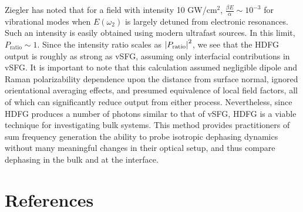 \documentclass[aip, jcp, reprint, onecolumn]{revtex4-2}
\begin{document}
 Ziegler has noted that for a field with intensity 10 GW/cm$^{2}$, $\frac{\beta E}{\alpha} \sim 10^{-3} $ for vibrational modes when $E(\omega_2)$ is largely detuned from electronic resonances. \cite{RN515}
 Such an intensity is easily obtained using modern ultrafast sources.
 In this limit, $P_\text{ratio} \sim 1$.
 Since the intensity ratio scales as $\abs{P_\text{ratio}}^2$, we see that the HDFG output is roughly as strong as vSFG, assuming only interfacial contributions in vSFG.
 It is important to note that this calculation assumed negligible dipole and Raman polarizability dependence upon the distance from surface normal, ignored orientational averaging effects, and presumed equivalence of local field factors, all of which can significantly reduce output from either process. 
 Nevertheless, since HDFG produces a number of photons similar to that of vSFG, HDFG is a viable technique for investigating bulk systems.
 This method provides practitioners of sum frequency generation the ability to probe isotropic dephasing dynamics without many meaningful changes in their optical setup, and thus compare  dephasing in the bulk and at the interface.\cite{RN224}

\section{References}

\end{document}
